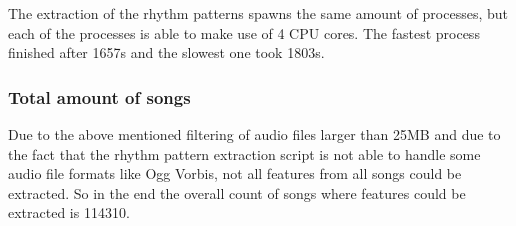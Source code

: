 \noindent The extraction of the rhythm patterns spawns the same amount of processes, but each of the processes is able to make use of 4 CPU cores. The fastest process finished after 1657s and the slowest one took 1803s.

\subsubsection{Total amount of songs}

Due to the above mentioned filtering of audio files larger than 25MB and due to the fact that the rhythm pattern extraction script is not able to handle some audio file formats like Ogg Vorbis, not all features from all songs could be extracted. So in the end the overall count of songs where features could be extracted is 114310.\\


